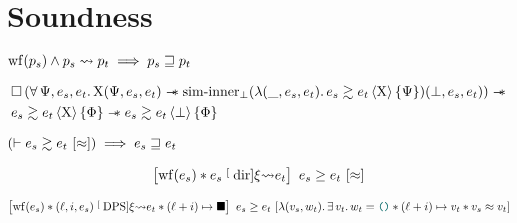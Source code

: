 \section{Soundness}









\begin{theorem}[Soundness]
    $
        \wf{p_s} \wedge p_s \tmc p_t \implies
        p_s \refined p_t
    $
\end{theorem}

\begin{theorem}
    \begin{align*}
            &
            \iPersistent \left(
                \forall \Psi, e_s, e_t \ldotp
                \Chi (\Psi, e_s, e_t) \iSepImp
                \mathrm{sim \mathhyphen inner}_\bot (\lambdaAbs (\_, e_s, e_t) \ldotp \iSim[\Chi]{\Psi}{e_s}{e_t}) (\bot, e_s, e_t)
            \right) \iSepImp
        \\
            &
            \iSim[\Chi]{\Phi}{e_s}{e_t} \iSepImp
            \iSim[\bot]{\Phi}{e_s}{e_t}
    \end{align*}
\end{theorem}

\begin{theorem}[Adequacy]
    $
        \left( \vdash \iSimv{\iSimilar}{e_s}{e_t} \right) \implies
        e_s \refined e_t
    $
\end{theorem}

\begin{theorem}
    \[
        \iCsimvHoare{
            \wf{e_s} \iSep
            e_s \tmcDir{\xi} e_t
        }{
            \iSimilar
        }{
            e_s
        }{
            e_t
        }
    \]
\end{theorem}

\begin{theorem}
    \[
        \iCsimvHoare{
            \wf{e_s} \iSep
            (\loc, i, e_s) \tmcDps{\xi} e_t \iSep
            (\loc + i) \mapsto \lambdHole
        }{
            \lambdaAbs (v_s, w_t) \ldotp
            \exists v_t \ldotp
            w_t = \lambdUnit \iSep
            (\loc + i) \mapsto v_t \iSep
            v_s \iSimilar v_t
        }{
            e_s
        }{
            e_t
        }
    \]
\end{theorem}

